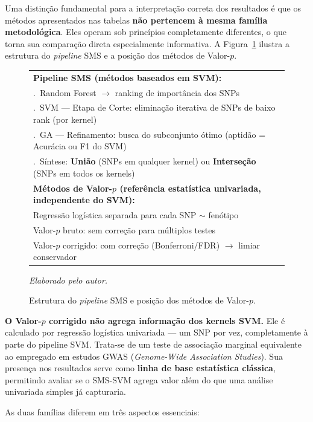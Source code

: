 \documentclass[
    12pt,
    a4paper,
    oneside,
    english,
    french,
    spanish,
    brazil
    ]{abntex2}
\renewcommand{\arraystretch}{1.3}
\newcommand{\novo}[1]{\textcolor{corNova}{#1}}
\begin{document}
\novo{Uma distinção fundamental para a interpretação correta dos resultados é que os métodos apresentados nas tabelas \textbf{não pertencem à mesma família metodológica}. Eles operam sob princípios completamente diferentes, o que torna sua comparação direta especialmente informativa. A Figura~\ref{fig:pipeline_sms} ilustra a estrutura do \textit{pipeline} SMS e a posição dos métodos de Valor-$p$.}

\begin{figure}[H]
\centering
\footnotesize
\renewcommand{\arraystretch}{1.3}
\begin{tabular}{p{13.5cm}}
\hline
\textbf{Pipeline SMS (métodos baseados em SVM):} \\
\quad 1.\ Random Forest $\rightarrow$ ranking de importância dos SNPs \\
\quad 2.\ SVM --- Etapa de Corte: eliminação iterativa de SNPs de baixo rank (por kernel) \\
\quad 3.\ GA --- Refinamento: busca do subconjunto ótimo (aptidão = Acurácia ou F1 do SVM) \\
\quad 4.\ Síntese: \textbf{União} (SNPs em qualquer kernel) ou \textbf{Interseção} (SNPs em todos os kernels) \\
\hline
\textbf{Métodos de Valor-$p$ (referência estatística univariada, independente do SVM):} \\
\quad Regressão logística separada para cada SNP $\sim$ fenótipo \\
\quad Valor-$p$ bruto: sem correção para múltiplos testes \\
\quad Valor-$p$ corrigido: com correção (Bonferroni/FDR) $\rightarrow$ limiar conservador \\
\hline
\end{tabular}
\caption{\novo{Estrutura do \textit{pipeline} SMS e posição dos métodos de Valor-$p$.}}
\label{fig:pipeline_sms}
\novo{\textit{Elaborado pelo autor.}}
\end{figure}

\novo{\textbf{O Valor-$p$ corrigido não agrega informação dos kernels SVM.} Ele é calculado por regressão logística univariada --- um SNP por vez, completamente à parte do pipeline SVM. Trata-se de um teste de associação marginal equivalente ao empregado em estudos GWAS (\textit{Genome-Wide Association Studies}). Sua presença nos resultados serve como \textbf{linha de base estatística clássica}, permitindo avaliar se o SMS-SVM agrega valor além do que uma análise univariada simples já capturaria.}

\novo{As duas famílias diferem em três aspectos essenciais:}
\end{document}
